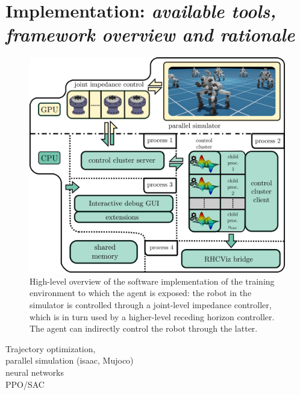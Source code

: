 \section{Implementation: \textnormal{\textit{available tools, framework overview and rationale}}}
\begin{figure}[t]
	\centering
	\includegraphics[width=0.9\columnwidth]{imgs/cocluster_arch.pdf}
	\caption{High-level overview of the software implementation of the training environment to which the agent is exposed: the robot in the simulator is controlled through a joint-level impedance controller, which is in turn used by a higher-level receding horizon controller. The agent can indirectly control the robot through the latter.}
	\label{fig:coclbridge_arch}
\end{figure}
Trajectory optimization, \\
parallel simulation (isaac, Mujoco)\\
neural networks\\
PPO/SAC\\

\cite{rl:mujocoaccelereted2023}
\cite{frameworks:mittal2023orbit}

